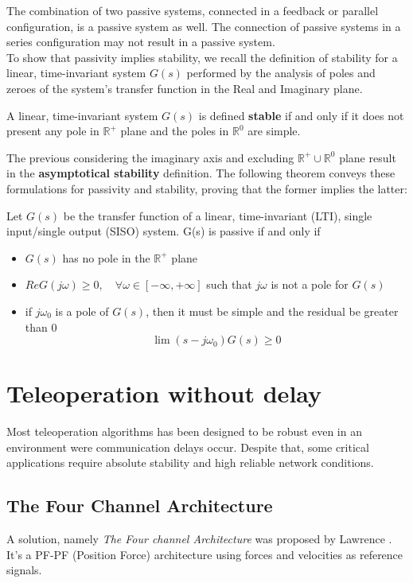 The combination of two passive systems, connected in a feedback or parallel configuration, is a passive system as well.
The connection of passive systems in a series configuration may not result in a passive system.\\
To show that passivity implies stability, we recall the definition of stability for a linear, time-invariant system $G(s)$ performed by the analysis of poles and zeroes of the system's transfer function in the Real and Imaginary plane.
\begin{definition}
	 A linear, time-invariant system $G(s)$ is defined \textbf{stable} if and only if it does not present any pole in $\mathbb{R}^{+}$ plane and the poles in  $\mathbb{R}^{0}$ are simple.
\end{definition}
The previous considering the imaginary axis and  excluding  $\mathbb{R}^{+} \cup \mathbb{R}^{0}$ plane result in the \textbf{asymptotical stability} definition.
The following theorem conveys these formulations for passivity and stability, proving that the former implies the latter:

\begin{theorem}
	Let $G(s)$ be the transfer function of a linear, time-invariant (LTI), single input/single output (SISO) system. G(s) is passive if and only if
	\begin{itemize}
		\item $G(s)$ has no pole in the $\mathbb{R}^{+}$ plane
		\item  $ReG(j\omega) \geq 0,\quad \forall\omega \in [−\infty, +\infty]$ such that $j\omega$ is not a pole for $G(s)$
		\item if $j\omega_{0}$ is a pole of $G(s)$, then it must be simple and the residual be greater than 0
		\[\lim(s − j\omega_{0})G(s) \geq 0\]
	\end{itemize}
\end{theorem}

\section{Teleoperation without delay}
Most teleoperation algorithms has been designed to be robust even in an environment were communication delays occur.
Despite that, some critical applications require absolute stability and high reliable network conditions.

\subsection{The Four Channel Architecture}
A solution, namely \textit{The Four channel Architecture} was proposed by Lawrence \cite{Lawrence1993}.\\
It's a PF-PF (Position Force) architecture using forces and velocities as reference signals.

